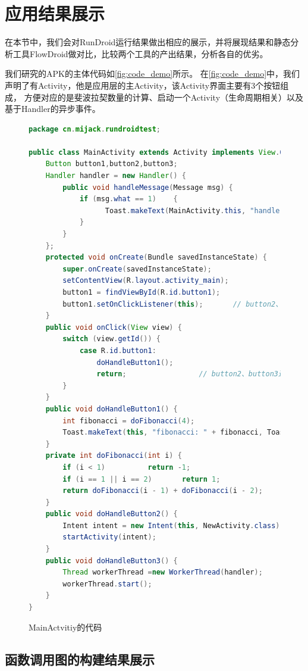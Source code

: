 \section{应用结果展示}  
在本节中，我们会对RunDroid运行结果做出相应的展示，并将展现结果和静态分析工具FlowDroid做对比，比较两个工具的产出结果，分析各自的优劣。

我们研究的APK的主体代码如\autoref{fig:code_demo}所示。
在\autoref{fig:code_demo}中，我们声明了有Activity，他是应用层的主Activity，该Activity界面主要有3个按钮组成，
方便对应的是斐波拉契数量的计算、启动一个Activity（生命周期相关）以及基于Handler的异步事件。



\begin{figure}[!h]
	\centering
	\begin{lstlisting}[language=Java]
package cn.mijack.rundroidtest;

public class MainActivity extends Activity implements View.OnClickListener {
	Button button1,button2,button3;
	Handler handler = new Handler() {
		public void handleMessage(Message msg) {
			if (msg.what == 1)    {
			      Toast.makeText(MainActivity.this, "handle", Toast.LENGTH_SHORT).show();
			}
		}
	};
	protected void onCreate(Bundle savedInstanceState) {
		super.onCreate(savedInstanceState);
		setContentView(R.layout.activity_main);
		button1 = findViewById(R.id.button1);
		button1.setOnClickListener(this);   	// button2、button3进行相同的操作，此处省略
	}
	public void onClick(View view) {
		switch (view.getId()) {
			case R.id.button1:
				doHandleButton1();
				return;				 	// button2、button3进行相同的操作，此处省略
		}
	}
	public void doHandleButton1() {
		int fibonacci = doFibonacci(4);
		Toast.makeText(this, "fibonacci: " + fibonacci, Toast.LENGTH_SHORT).show();
	}
	private int doFibonacci(int i) {
		if (i < 1)			return -1;
		if (i == 1 || i == 2) 		return 1;
		return doFibonacci(i - 1) + doFibonacci(i - 2);
	}
	public void doHandleButton2() {
		Intent intent = new Intent(this, NewActivity.class);
		startActivity(intent);
	}
	public void doHandleButton3() {
		Thread workerThread =new WorkerThread(handler);
		workerThread.start();
	}
}\end{lstlisting}
	\caption{MainActvitiy的代码}
	\label{fig:code_demo}
\end{figure}



\subsection{函数调用图的构建结果展示}

